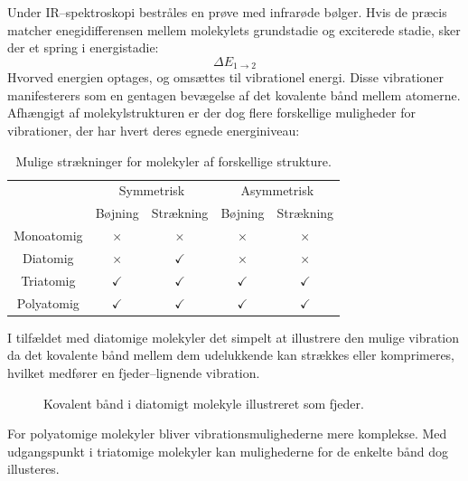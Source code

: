     Under IR--spektroskopi bestråles en prøve med infrarøde bølger. Hvis de præcis matcher enegidifferensen mellem molekylets grundstadie og exciterede stadie, sker der et spring i energistadie:
    \[
        \Delta E_{1 \rightarrow 2}
    \]
    Hvorved energien optages, og omsættes til vibrationel energi. Disse vibrationer manifesterers som en gentagen bevægelse af det kovalente bånd mellem atomerne. Afhængigt af molekylstrukturen er der dog flere forskellige muligheder for vibrationer, der har hvert deres egnede energiniveau:
    \begin{table}[H]\center
        \caption{Mulige strækninger for molekyler af forskellige strukture.}
        \begin{tabular}{ccccc}
            \toprule
            & \multicolumn{2}{c}{Symmetrisk} & \multicolumn{2}{c}{Asymmetrisk} \\
            \cmidrule(r){2-3} \cmidrule(r){4-5}
            & Bøjning & Strækning & Bøjning & Strækning \\
            \midrule
            Monoatomig & $\times$ & $\times$ & $\times$ & $\times$ \\
            Diatomig & $\times$ & $\checkmark$ & $\times$ & $\times$ \\
            Triatomig & $\checkmark$ & $\checkmark$ & $\checkmark$ & $\checkmark$ \\
            Polyatomig & $\checkmark$ & $\checkmark$ & $\checkmark$ & $\checkmark$ \\
            \bottomrule
        \end{tabular}
    \end{table}
    I tilfældet med diatomige molekyler det simpelt at illustrere den mulige vibration da det kovalente bånd mellem dem udelukkende kan strækkes eller komprimeres, hvilket medfører en fjeder--lignende vibration.
    \begin{figure}[H]\centering
        \caption{Kovalent bånd i diatomigt molekyle illustreret som fjeder.}
    \end{figure}
    For polyatomige molekyler bliver vibrationsmulighederne mere komplekse. Med udgangspunkt i triatomige molekyler kan mulighederne for de enkelte bånd dog illusteres. 

